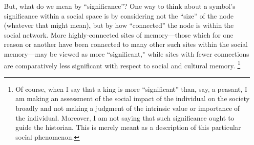 But, what do we mean by ``significance''? One way to think about a symbol's significance within a social space is by considering not the ``size'' of the node (whatever that might mean), but by how ``connected'' the node is within the social network. More highly-connected sites of memory---those which for one reason or another have been connected to many other such sites within the social memory---may be viewed as more ``significant,'' while sites with fewer connections are comparatively less significant with respect to social and cultural memory.%
    \footnote{Of course, when I say that a king is more ``significant'' than, say, a peasant, I am making an assessment of the social impact of the individual on the society broadly and not making a judgment of the intrinsic value or importance of the individual. Moreover, I am not saying that such significance ought to guide the historian. This is merely meant as a description of this particular social phenomenon.}


